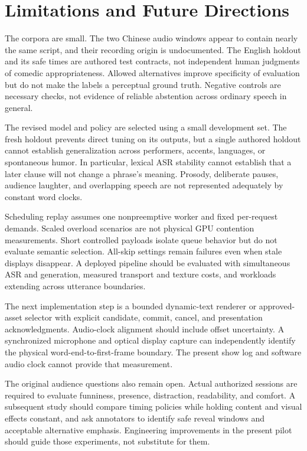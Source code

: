 \section{Limitations and Future Directions}
The corpora are small. The two Chinese audio windows appear to contain nearly the same script, and their recording origin is undocumented. The English holdout and its safe times are authored test contracts, not independent human judgments of comedic appropriateness. Allowed alternatives improve specificity of evaluation but do not make the labels a perceptual ground truth. Negative controls are necessary checks, not evidence of reliable abstention across ordinary speech in general.

The revised model and policy are selected using a small development set. The fresh holdout prevents direct tuning on its outputs, but a single authored holdout cannot establish generalization across performers, accents, languages, or spontaneous humor. In particular, lexical ASR stability cannot establish that a later clause will not change a phrase's meaning. Prosody, deliberate pauses, audience laughter, and overlapping speech are not represented adequately by constant word clocks.

Scheduling replay assumes one nonpreemptive worker and fixed per-request demands. Scaled overload scenarios are not physical GPU contention measurements. Short controlled payloads isolate queue behavior but do not evaluate semantic selection. All-skip settings remain failures even when stale displays disappear. A deployed pipeline should be evaluated with simultaneous ASR and generation, measured transport and texture costs, and workloads extending across utterance boundaries.

The next implementation step is a bounded dynamic-text renderer or approved-asset selector with explicit candidate, commit, cancel, and presentation acknowledgments. Audio-clock alignment should include offset uncertainty. A synchronized microphone and optical display capture can independently identify the physical word-end-to-first-frame boundary. The present show log and software audio clock cannot provide that measurement.

The original audience questions also remain open. Actual authorized sessions are required to evaluate funniness, presence, distraction, readability, and comfort. A subsequent study should compare timing policies while holding content and visual effects constant, and ask annotators to identify safe reveal windows and acceptable alternative emphasis. Engineering improvements in the present pilot should guide those experiments, not substitute for them.

